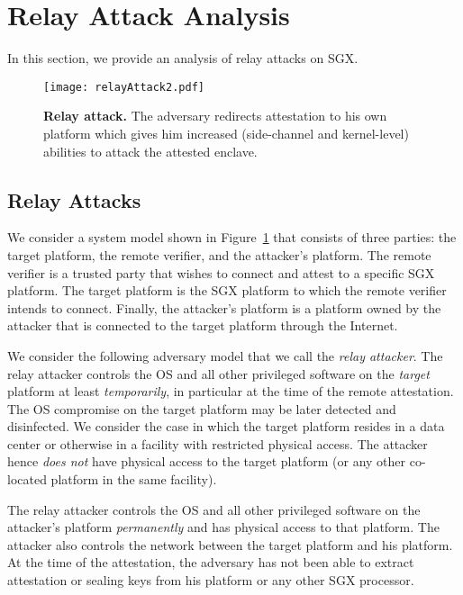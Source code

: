 
\section{Relay Attack Analysis}
\label{sec:problemStatement}

In this section, we provide an analysis of relay attacks on SGX. 

\begin{figure}[t]
 \centering
  \texttt{[image: relayAttack2.pdf]}
 \caption{\textbf{Relay attack.} The adversary redirects attestation to his own platform which gives him increased (side-channel and kernel-level) abilities to attack the attested enclave.}
 \figsaver
 \label{fig:SystemModel}
\end{figure}


\subsection{Relay Attacks}
\label{sec:problemStatement:systemAttackerModel}

We consider a system model shown in Figure~\ref{fig:SystemModel} that consists of three parties: the target platform, the remote verifier, and the attacker's platform. The remote verifier is a trusted party that wishes to connect and attest to a specific SGX platform. The target platform is the SGX platform to which the remote verifier intends to connect. Finally, the attacker's platform is a platform owned by the attacker that is connected to the target platform through the Internet.


\parasaver
{} We consider the following adversary model that we call the \emph{relay attacker}. The relay attacker controls the OS and all other privileged software on the \emph{target} platform at least \emph{temporarily}, in particular at the time of the remote attestation. The OS compromise on the target platform may be later detected and disinfected. We consider the case in which the target platform resides in a data center or otherwise in a facility with restricted physical access. The attacker hence \emph{does not} have physical access to the target platform (or any other co-located platform in the same facility). %

The relay attacker controls the OS and all other privileged software on the attacker's platform \emph{permanently} and has physical access to that platform. The attacker also controls the network between the target platform and his platform. At the time of the attestation, the adversary has not been able to extract attestation or sealing keys from his platform or any other SGX processor.


